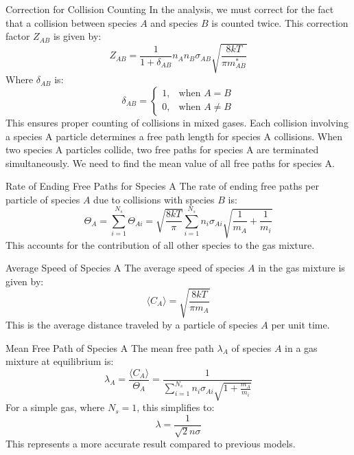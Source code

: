 \documentclass{beamer}
\begin{document}
\begin{frame}{Correction for Collision Counting}
    In the analysis, we must correct for the fact that a collision between species \( A \) and species \( B \) is counted twice. This correction factor \( Z_{AB} \) is given by:
    \[
    Z_{AB} = \frac{1}{1 + \delta_{AB}} n_A n_B \sigma_{AB} \sqrt{\frac{8kT}{\pi m^*_{AB}}}
    \]
    Where \( \delta_{AB} \) is:
    \[
    \delta_{AB} = \begin{cases} 
        1, & \text{when } A = B \\
        0, & \text{when } A \neq B 
    \end{cases}
    \]
    This ensures proper counting of collisions in mixed gases. Each collision involving a species
A particle determines a free path length for species A collisions. When two species A particles collide, two free paths for species A are terminated simultaneously. We need to find the mean value of all free paths for species A.
\end{frame}

\begin{frame}{Rate of Ending Free Paths for Species A}
    The rate of ending free paths per particle of species \( A \) due to collisions with species \( B \) is:
    \[
    \Theta_A = \sum_{i=1}^{N_s} \Theta_{Ai} = \sqrt{\frac{8kT}{\pi}} \sum_{i=1}^{N_s} n_i \sigma_{Ai} \sqrt{\frac{1}{m_A} + \frac{1}{m_i}}
    \]
    This accounts for the contribution of all other species to the gas mixture.
\end{frame}

\begin{frame}{Average Speed of Species A}
    The average speed of species \( A \) in the gas mixture is given by:
    \[
    \langle C_A \rangle = \sqrt{\frac{8kT}{\pi m_A}}
    \]
    This is the average distance traveled by a particle of species \( A \) per unit time.
\end{frame}

\begin{frame}{Mean Free Path of Species A}
    The mean free path \( \lambda_A \) of species \( A \) in a gas mixture at equilibrium is:
    \[
    \lambda_A = \frac{\langle C_A \rangle}{\Theta_A} = \frac{1}{\sum_{i=1}^{N_s} n_i \sigma_{Ai} \sqrt{1 + \frac{m_A}{m_i}}}
    \]
    For a simple gas, where \( N_s = 1 \), this simplifies to:
    \[
    \lambda = \frac{1}{\sqrt{2} n \sigma}
    \]
    This represents a more accurate result compared to previous models.
\end{frame}
\end{document}
